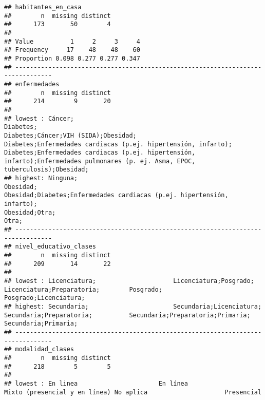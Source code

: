 \documentclass[
]{book}
\begin{document}
\begin{verbatim}
## habitantes_en_casa 
##        n  missing distinct 
##      173       50        4 
##                                   
## Value          1     2     3     4
## Frequency     17    48    48    60
## Proportion 0.098 0.277 0.277 0.347
## --------------------------------------------------------------------------------
## enfermedades 
##        n  missing distinct 
##      214        9       20 
## 
## lowest : Cáncer;                                                                                                                           Diabetes;                                                                                                                         Diabetes;Cáncer;VIH (SIDA);Obesidad;                                                                                              Diabetes;Enfermedades cardiacas (p.ej. hipertensión, infarto);                                                                    Diabetes;Enfermedades cardiacas (p.ej. hipertensión, infarto);Enfermedades pulmonares (p. ej. Asma, EPOC, tuberculosis);Obesidad;
## highest: Ninguna;                                                                                                                          Obesidad;                                                                                                                         Obesidad;Diabetes;Enfermedades cardiacas (p.ej. hipertensión, infarto);                                                           Obesidad;Otra;                                                                                                                    Otra;                                                                                                                            
## --------------------------------------------------------------------------------
## nivel_educativo_clases 
##        n  missing distinct 
##      209       14       22 
## 
## lowest : Licenciatura;                     Licenciatura;Posgrado;            Licenciatura;Preparatoria;        Posgrado;                         Posgrado;Licenciatura;           
## highest: Secundaria;                       Secundaria;Licenciatura;          Secundaria;Preparatoria;          Secundaria;Preparatoria;Primaria; Secundaria;Primaria;             
## --------------------------------------------------------------------------------
## modalidad_clases 
##        n  missing distinct 
##      218        5        5 
## 
## lowest : En linea                      En línea                      Mixto (presencial y en línea) No aplica                     Presencial                   

\end{verbatim}
\end{document}
